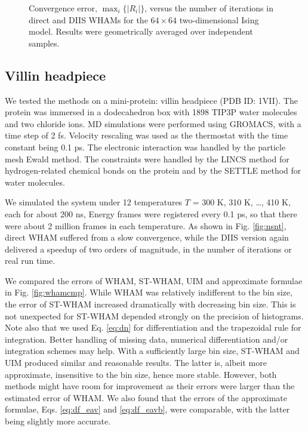 \documentclass[reprint,aip,jcp,superscriptaddress]{revtex4-1}
\begin{document}
\begin{figure}[h]
  \caption{
    \label{fig:is2trace}
    Convergence error, $\max_i \{ |R_i| \}$,
    versus the number of iterations
    in direct and DIIS WHAMs
    for the $64\times64$ two-dimensional Ising model.
    Results were geometrically averaged over independent samples.
  }
\end{figure}





\subsection{\label{sec:results_villin}
Villin headpiece}



We tested the methods on a mini-protein:
villin headpiece\cite{duan1998}
(PDB ID: 1VII).
%
The protein was immersed in
a dodecahedron box with 1898 TIP3P water molecules and two chloride ions.
%
MD simulations were performed
using GROMACS\cite{
berendsen1995, *lindahl2001, *vanderspoel2005, *hess2008},
with a time step of 2 fs.
%
Velocity rescaling\cite{bussi2007}
was used as the thermostat with
the time constant being 0.1 ps.
%
The electronic interaction was
handled by the particle mesh Ewald method\cite{
essmann1995}.
%
The constraints were handled by the LINCS method\cite{
hess1997}
for hydrogen-related chemical bonds on the protein
and by the SETTLE method\cite{
miyamoto1992}
for water molecules.
%



We simulated the system under 12 temperatures
$T$ = 300 K, 310 K, \dots, 410 K,
each for about 200 ns,
%
Energy frames were registered every 0.1 ps,
so that there were about 2 million frames
in each temperature.
%
As shown in Fig. \ref{fig:nsnt},
direct WHAM suffered from a slow convergence,
while the DIIS version again
delivered a speedup of two orders of magnitude,
in the number of iterations or real run time.



We compared the errors of WHAM, ST-WHAM, UIM
and approximate formulae in Fig. \ref{fig:whamcmp}.
%
While WHAM was
relatively indifferent to the bin size,
%
the error of ST-WHAM
increased dramatically with decreasing bin size.
%
This is not unexpected for ST-WHAM depended strongly
on the precision of histograms.
%
Note also that
we used Eq. \eqref{eq:dn} for differentiation
and the trapezoidal rule for integration.
%
Better handling of missing data,
numerical differentiation
and/or integration schemes\cite{
kim2011} may help.
%
With a sufficiently large bin size,
ST-WHAM and UIM produced similar and reasonable results.
%
The latter is, albeit more approximate,
insensitive to the bin size, hence more stable.
%
However, both methods might have room for improvement
as their errors were larger than the estimated error of WHAM.
%
We also found that the errors
of the approximate formulae,
Eqs. \eqref{eq:df_eav} and \eqref{eq:df_eavb},
were comparable,
with the latter being slightly more accurate.
%
\end{document}
